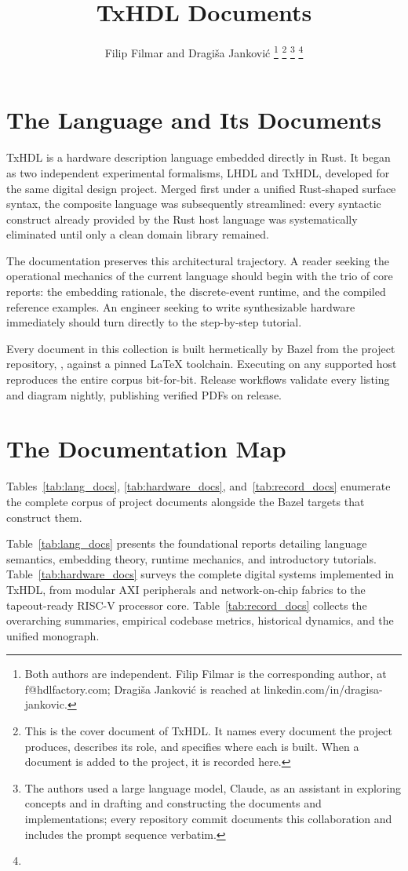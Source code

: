 \documentclass[journal,onecolumn,9pt]{IEEEtran}
\title{TxHDL Documents}
\author{Filip Filmar and Dragiša Janković%
\thanks{Both authors are independent. Filip Filmar is the
corresponding author, at f@hdlfactory.com; Dragiša Janković is
reached at linkedin.com/in/dragisa-jankovic.}%
\thanks{This is the cover document of TxHDL. It names every document
the project produces, describes its role, and specifies where each is
built. When a document is added to the project, it is recorded here.}%
\thanks{The authors used a large language model, Claude, as an
assistant in exploring concepts and in drafting and constructing
the documents and implementations; every repository commit documents
this collaboration and includes the prompt sequence verbatim.}%
\thanks{\buildstamp}}
\begin{document}
\maketitle

\section{The Language and Its Documents}

TxHDL is a hardware description language embedded directly in Rust. It began
as two independent experimental formalisms, LHDL and TxHDL, developed for the
same digital design project. Merged first under a unified Rust-shaped surface
syntax, the composite language was subsequently streamlined: every syntactic
construct already provided by the Rust host language was systematically
eliminated until only a clean domain library remained.

The documentation preserves this architectural trajectory. A reader seeking
the operational mechanics of the current language should begin with the trio
of core reports: the embedding rationale, the discrete-event runtime, and the
compiled reference examples. An engineer seeking to write synthesizable
hardware immediately should turn directly to the step-by-step tutorial.

Every document in this collection is built hermetically by Bazel from the
project repository, , against a pinned \LaTeX{} toolchain.
Executing  on any supported host reproduces the
entire corpus bit-for-bit. Release workflows validate every listing and diagram
nightly, publishing verified PDFs on release.

\section{The Documentation Map}

Tables~\ref{tab:lang_docs}, \ref{tab:hardware_docs}, and~\ref{tab:record_docs}
enumerate the complete corpus of project documents alongside the Bazel targets
that construct them.

Table~\ref{tab:lang_docs} presents the foundational reports detailing language
semantics, embedding theory, runtime mechanics, and introductory tutorials.
Table~\ref{tab:hardware_docs} surveys the complete digital systems implemented
in TxHDL, from modular AXI peripherals and network-on-chip fabrics to the
tapeout-ready RISC-V processor core. Table~\ref{tab:record_docs} collects the
overarching summaries, empirical codebase metrics, historical dynamics, and
the unified monograph.
\end{document}
